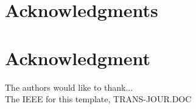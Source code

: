 \documentclass[10pt,journal,compsoc]{IEEEtran}
\begin{document}
\ifCLASSOPTIONcompsoc
  \section*{Acknowledgments}
\else
  \section*{Acknowledgment}
\fi


The authors would like to thank...\\
The IEEE for this template, TRANS-JOUR.DOC


\ifCLASSOPTIONcaptionsoff
  \newpage
\fi




\end{document}
